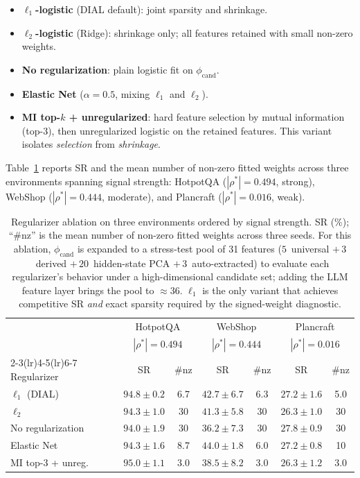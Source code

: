 \begin{itemize}
\item \textbf{$\ell_1$-logistic} (DIAL default): joint sparsity and
shrinkage.
\item \textbf{$\ell_2$-logistic} (Ridge): shrinkage only; all
features retained with small non-zero weights.
\item \textbf{No regularization}: plain logistic fit on
$\phi_{\text{cand}}$.
\item \textbf{Elastic Net} ($\alpha{=}0.5$, mixing $\ell_1$ and
$\ell_2$).
\item \textbf{MI top-$k$ + unregularized}: hard feature selection
by mutual information (top-3), then unregularized logistic on the
retained features. This variant isolates \emph{selection} from
\emph{shrinkage}.
\end{itemize}

Table~\ref{tab:regularizer-ablation} reports SR and the mean number
of non-zero fitted weights across three environments spanning
signal strength: HotpotQA ($|\rho^*|{=}0.494$, strong),
WebShop ($|\rho^*|{=}0.444$, moderate), and Plancraft
($|\rho^*|{=}0.016$, weak).

\begin{table}[h]
\caption{Regularizer ablation on three environments ordered by
signal strength. SR (\%); ``\#nz'' is the mean number of non-zero
fitted weights across three seeds. For this ablation, $\phi_{\text{cand}}$ is expanded to a
stress-test pool of 31 features ($5$~universal $+\,3$~derived
$+\,20$~hidden-state PCA $+\,3$~auto-extracted) to evaluate each
regularizer's behavior under a high-dimensional candidate set;
adding the LLM feature layer brings the pool to $\approx$36.
$\ell_1$ is the only variant that achieves competitive SR
\emph{and} exact sparsity required by the signed-weight
diagnostic.}
\label{tab:regularizer-ablation}
\centering\small
\begin{tabular}{lcccccc}
\toprule
 & \multicolumn{2}{c}{HotpotQA} & \multicolumn{2}{c}{WebShop} & \multicolumn{2}{c}{Plancraft} \\
 & \multicolumn{2}{c}{$|\rho^*|{=}0.494$} & \multicolumn{2}{c}{$|\rho^*|{=}0.444$} & \multicolumn{2}{c}{$|\rho^*|{=}0.016$} \\
\cmidrule(lr){2-3}\cmidrule(lr){4-5}\cmidrule(lr){6-7}
Regularizer & SR & \#nz & SR & \#nz & SR & \#nz \\
\midrule
$\ell_1$ (DIAL)       & $94.8\pm0.2$ & 6.7 & $42.7\pm6.7$ & 6.3 & $27.2\pm1.6$ & 5.0 \\
$\ell_2$              & $94.3\pm1.0$ & 30  & $41.3\pm5.8$ & 30  & $26.3\pm1.0$ & 30  \\
No regularization     & $94.0\pm1.9$ & 30  & $36.2\pm7.3$ & 30  & $27.8\pm0.9$ & 30  \\
Elastic Net           & $94.3\pm1.6$ & 8.7 & $44.0\pm1.8$ & 6.0 & $27.2\pm0.8$ & 10  \\
MI top-3 + unreg.     & $95.0\pm1.1$ & 3.0 & $38.5\pm8.2$ & 3.0 & $26.3\pm1.2$ & 3.0 \\
\bottomrule
\end{tabular}
\end{table}

